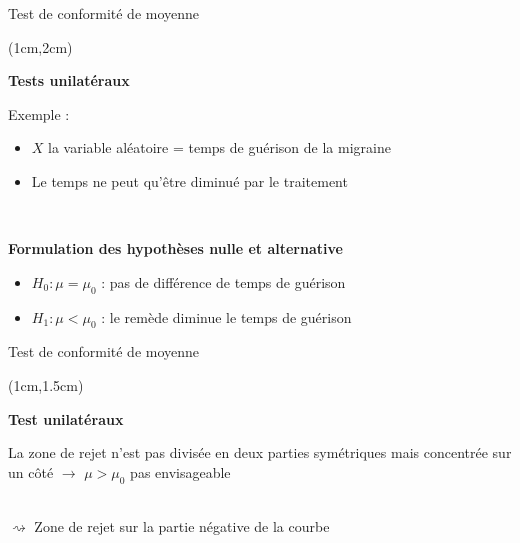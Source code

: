 \documentclass{beamer}
\begin{document}

\begin{frame}{Test de conformité de moyenne}
\begin{textblock*}{\textwidth}(1cm,2cm)

\begin{center}{\bf \Large  Tests unilatéraux  } \end{center}


Exemple :
\begin{itemize}
\item  $X$ la variable aléatoire = temps de guérison de la migraine
\item Le temps ne peut qu'être diminué par le traitement
\end{itemize}

\

{\bf Formulation des hypothèses nulle et alternative }

\begin{itemize}
\item $H_0 : \mu=\mu_0$ : pas de différence de temps de guérison
\item $H_1 : \mu <\mu_0$ : le remède diminue le temps de guérison 
\end{itemize}


\end{textblock*}

\end{frame}
 



\begin{frame}{Test de conformité de moyenne}
\begin{textblock*}{\textwidth}(1cm,1.5cm)

\begin{center}{\bf \Large Test unilatéraux } \end{center}

La zone de rejet n'est pas divisée en deux parties symétriques mais
concentrée sur un côté \; $\rightarrow$ \; $\mu>\mu_0$ pas envisageable \\

\ 

 $\rightsquigarrow$ Zone de rejet sur la partie négative de la courbe

\begin{center}
\end{center}
\end{textblock*}

\end{frame}
\end{document}
